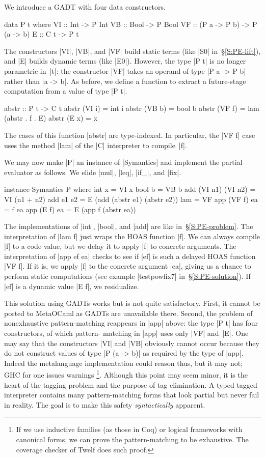 We introduce a GADT with four data constructors.
\begin{code}
data P t where
  VI :: Int  -> P Int
  VB :: Bool -> P Bool
  VF :: (P a -> P b) -> P (a -> b)
  E  :: C t -> P t
\end{code}
The constructors |VI|, |VB|, and |VF| build static terms (like |S0|
in~\S\ref{S:PE-lift}), and |E| builds dynamic terms (like |E0|).  However,
the type |P t| is no longer parametric in~|t|: the constructor |VF| takes an
operand of type |P a -> P b| rather than |a -> b|. As before, we define a
function to extract a future-stage computation from a value of type |P t|.
\begin{code}
abstr :: P t -> C t
abstr (VI i) = int i
abstr (VB b) = bool b
abstr (VF f) = lam (abstr . f . E)
abstr (E x)  = x
\end{code}
The cases of this function |abstr| are type-indexed.  In particular, the |VF f|
case uses the method |lam| of the |C| interpreter to compile~|f|.

We may now make |P| an instance of
|Symantics| and implement the partial evaluator as follows. We elide
|mul|, |leq|, |if_|, and |fix|.
\begin{code}
instance Symantics P where
  int x  = VI x
  bool b = VB b
  add (VI n1) (VI n2) = VI (n1 + n2)
  add e1 e2 = E (add (abstr e1) (abstr e2))
  lam = VF
  app (VF f) ea = f ea
  app (E f)  ea = E (app f (abstr ea))
\end{code}
The implementations of |int|, |bool|, and |add| are like
in~\S\ref{S:PE-problem}.
The interpretation of |lam f| just wraps the
HOAS function |f|. We can always compile |f| to a code value,
but we delay it to apply |f| to concrete arguments. The interpretation of
|app ef ea| checks to see if |ef| is such a delayed
HOAS function |VF f|. If it is, we apply |f| to the
concrete argument |ea|, giving us a chance to perform static
computations (see example |testpowfix7| in~\S\ref{S:PE-solution}). If |ef| is a
dynamic value |E f|, we residualize.

This solution using GADTs works but is not quite satisfactory. First, it
cannot be ported to MetaOCaml as GADTs are unavailable there.  Second,
the problem of nonexhaustive pattern\hyp matching reappears in |app|
above: the type |P t| has four constructors, of which pattern\hyp
matching in |app| uses only |VF| and~|E|. One may say that the
constructors |VI| and |VB| obviously cannot occur because they do not
construct values of type |P (a -> b)| as required by the type of |app|.
Indeed the metalanguage implementation could reason thus, 
but it may not; GHC for one issues warnings%
\footnote{If we use inductive families (as those in Coq) or logical
  frameworks with canonical forms, we can prove the pattern-matching
  to be exhaustive. The coverage checker of Twelf does such proof.}. 
Although this point may seem minor, it is the heart of
the tagging problem and the purpose of tag elimination. A typed tagged
interpreter contains many pattern\hyp matching forms that look partial
but never fail in reality. The goal is to make this safety
\emph{syntactically} apparent.



